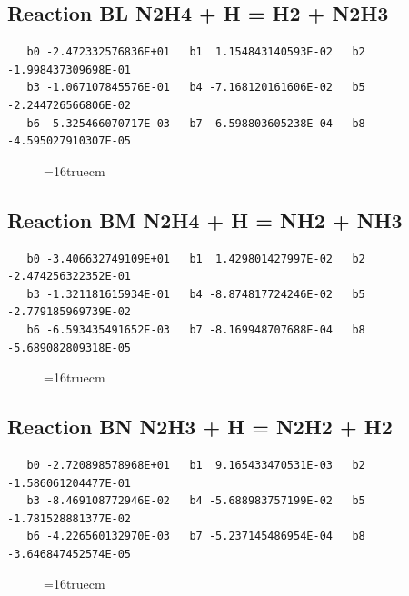 \documentclass[12pt,dvipdfm]{article}
\begin{document}
\subsection{
Reaction BL N2H4 + H = H2 + N2H3 }
\begin{small}\begin{verbatim}
   b0 -2.472332576836E+01   b1  1.154843140593E-02   b2 -1.998437309698E-01
   b3 -1.067107845576E-01   b4 -7.168120161606E-02   b5 -2.244726566806E-02
   b6 -5.325466070717E-03   b7 -6.598803605238E-04   b8 -4.595027910307E-05
\end{verbatim}\end{small}
\begin{figure}[h!] \label{n2rates}
\epsfxsize=16truecm
\end{figure}
\newpage

\subsection{
Reaction BM N2H4 + H = NH2 + NH3 }
\begin{small}\begin{verbatim}
   b0 -3.406632749109E+01   b1  1.429801427997E-02   b2 -2.474256322352E-01
   b3 -1.321181615934E-01   b4 -8.874817724246E-02   b5 -2.779185969739E-02
   b6 -6.593435491652E-03   b7 -8.169948707688E-04   b8 -5.689082809318E-05
\end{verbatim}\end{small}
\begin{figure}[h!] \label{n2rates}
\epsfxsize=16truecm
\end{figure}
\newpage

\subsection{
Reaction BN N2H3 + H = N2H2 + H2 }
\begin{small}\begin{verbatim}
   b0 -2.720898578968E+01   b1  9.165433470531E-03   b2 -1.586061204477E-01
   b3 -8.469108772946E-02   b4 -5.688983757199E-02   b5 -1.781528881377E-02
   b6 -4.226560132970E-03   b7 -5.237145486954E-04   b8 -3.646847452574E-05
\end{verbatim}\end{small}
\begin{figure}[h!] \label{n2rates}
\epsfxsize=16truecm
\end{figure}
\newpage
\end{document}
